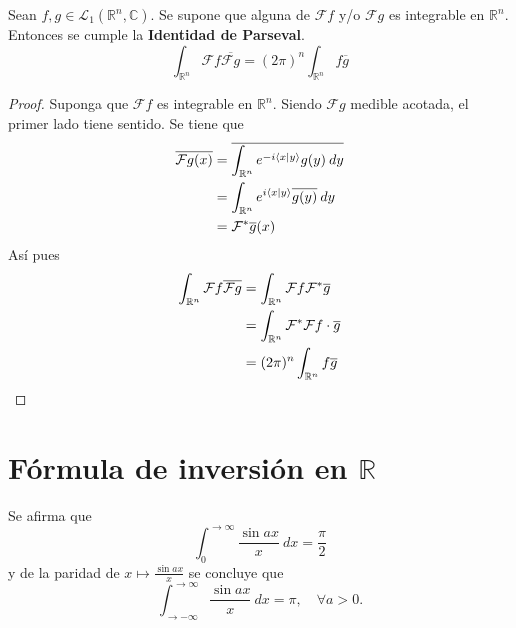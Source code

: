 \documentclass[12pt]{report}
\theoremstyle{largebreak}
\newcommand\pint[2]{\ensuremath{\langle#1| #2\rangle}}
\newcommand\conj[1]{\ensuremath{\overline{#1}}}
\newcommand{\fou}[1]{\ensuremath{\mathcal{F}#1}}
\begin{document}
    \begin{propo}
        Sean $f,g\in\mathcal{L}_1(\mathbb{R}^n,\mathbb{C})$. Se supone que alguna de $\fou{f}$ y/o $\fou{g}$ es integrable en $\mathbb{R}^n$. Entonces se cumple la \textbf{Identidad de Parseval}.
        \begin{equation*}
            \int_{\mathbb{R}^n}\fou{f}\conj{\fou{g}}=(2\pi)^n\int_{\mathbb{R}^n}f\conj{g}
        \end{equation*}
    \end{propo}

    \begin{proof}
        Suponga que $\fou{f}$ es integrable en $\mathbb{R}^n$. Siendo $\fou{g}$ medible acotada, el primer lado tiene sentido. Se tiene que
        \begin{equation*}
            \begin{split}
                \conj{\fou{g}(x)}&=\conj{\int_{\mathbb{R}^n}e^{ -i\pint{x}{y}}g(y)\:dy}\\
                &=\int_{\mathbb{R}^n}e^{i\pint{x}{y}}\conj{g(y)}\:dy\\
                &=\fou^*{\conj{g}}(x)\\
            \end{split}
        \end{equation*}
        Así pues
        \begin{equation*}
            \begin{split}
                \int_{\mathbb{R}^n}\fou{f}\conj{\fou{g}}&=\int_{\mathbb{R}^n}\fou{f}\fou^*{\conj{g}}\\
                &=\int_{\mathbb{R}^n}\fou^*{\fou{f}}\cdot\conj{g}\\
                &=(2\pi)^n\int_{\mathbb{R}^n}f\conj{g}\\
            \end{split}
        \end{equation*}
    \end{proof}

    \section{Fórmula de inversión en $\mathbb{R}$}

    \begin{obs}
        Se afirma que
        \begin{equation*}
            \int_{0}^{\rightarrow\infty}\frac{\sin ax}{x}\:dx=\frac{\pi}{2}
        \end{equation*}
        y de la paridad de $x\mapsto\frac{\sin ax}{x}$ se concluye que
        \begin{equation*}
            \int_{ \rightarrow-\infty}^{\rightarrow\infty}\frac{\sin ax}{x}\:dx=\pi,\quad\forall a>0.
        \end{equation*}
    \end{obs}
\end{document}
